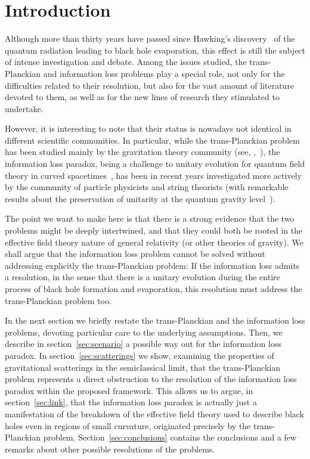 \documentclass[prd, groupedaddress, showpacs, showkeys, onecolumn, nofootinbib]{revtex4}
\begin{document}
\section{Introduction}
\label{sec:intro}

Although more than thirty years have passed since Hawking's discovery~\cite{Hawking:1974rv, Hawking:1974sw} of the quantum radiation leading to black hole evaporation, this effect is still the subject of intense investigation and debate. Among the issues studied, the trans-Planckian and information loss problems play a special role, not only for the difficulties related to their resolution, but also for the vast amount of literature devoted to them, as well as for the new lines of research they stimulated to undertake.

However, it is interesting to note that their status is nowadays not identical in different scientific communities.  In particular, while the trans-Planckian problem has been studied mainly by the gravitation theory community (see, \eg,~\cite{Unruh:1980cg,Unruh:1994je,Brout:1995wp,Corley:1996ar,Barrabes:1998iw,Parentani:1999qv,Barrabes:2000fr,Parentani:2000ts,Parentani:2007mb,Unruh:2004zk}), the information loss paradox, being a challenge to unitary evolution for quantum field theory in curved spacetimes~\cite{Hawking:1976ra, Hawking:1982dj}, has been in recent years investigated more actively by the community of particle physicists and string theorists (with remarkable results about the preservation of unitarity at the quantum gravity level~\cite{Stephens:1993an, 'tHooft:1996tq, Maldacena:2001kr}).

The point we want to make here is that there is a strong evidence that the two problems might be deeply intertwined, and that they could both be rooted in the effective field theory nature of general relativity (or other theories of gravity).  We shall argue that the information loss problem cannot be solved without addressing explicitly the trans-Planckian problem:  If the information loss admits a resolution, in the sense that there is a unitary evolution during the entire process of black hole formation and evaporation, this resolution must address the trans-Planckian problem too.

In the next section we briefly restate the trans-Planckian and the information loss problems, devoting particular care to the underlying assumptions.  Then, we describe in section~\ref{sec:scenario} a possible way out for the information loss paradox.  In section~\ref{sec:scatterings} we show, examining the properties of gravitational scatterings in the semiclassical limit, that the trans-Planckian problem represents a direct obstruction to the resolution of the information loss paradox within the proposed framework.  This allows us to argue, in section~\ref{sec:link}, that the information loss paradox is actually just a manifestation of the breakdown of the effective field theory used to describe black holes even in regions of small curvature, originated precisely by the trans-Planckian problem.  Section~\ref{sec:conclusions} contains the conclusions and a few remarks about other possible resolutions of the problems.
\end{document}
